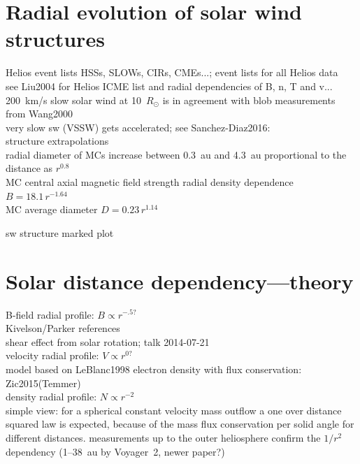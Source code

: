 \section{Radial evolution of solar wind structures}

Helios event lists HSSs, SLOWs, CIRs, CMEs...; event lists for all Helios data\\
see Liu2004 for Helios ICME list and radial dependencies of B, n, T and v...\\

200~km/s slow solar wind at 10~$R_\odot$ is in agreement with blob measurements from Wang2000\\

very slow sw (VSSW) gets accelerated; see Sanchez-Diaz2016:\\

structure extrapolations\\

radial diameter of MCs increase between 0.3~au and 4.3~au proportional to the distance as $r^{0.8}$ \citep{Bothmer1998}\\

MC central axial magnetic field strength radial density dependence $B = 18.1\,r^{-1.64}$ \citet{Leitner2007}\\
MC average diameter $D = 0.23\,r^{1.14}$ \citet{Leitner2007}

sw structure marked plot\\


\section{Solar distance dependency---theory}
B-field radial profile: $B \propto r^{-.5?}$\\
	Kivelson/Parker references\\
	shear effect from solar rotation; talk 2014-07-21\\
velocity radial profile: $V \propto r^{0?}$\\
	model based on LeBlanc1998 electron density with flux conservation: Zic2015(Temmer)\\
density radial profile: $N \propto r^{-2}$\\
	simple view: for a spherical constant velocity mass outflow a one over distance squared law is expected, because of the mass flux conservation per solid angle for different distances. measurements up to the outer heliosphere confirm the $1/r^2$ dependency (1--38~au by Voyager~2, \citep{Belcher1993} newer paper?)\\

